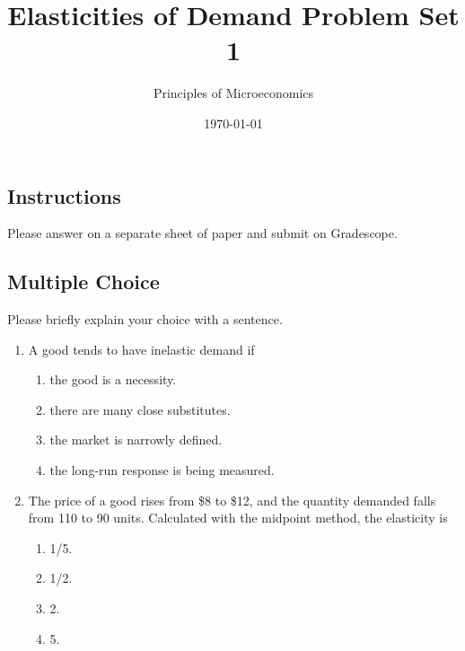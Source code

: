 \documentclass{article}
\title{Elasticities of Demand Problem Set 1}
\author{Principles of Microeconomics}
\date{\today}
\begin{document}
\maketitle

\subsection*{Instructions} Please answer on a separate sheet of paper and submit on Gradescope. 

\subsection*{Multiple Choice} Please briefly explain your choice with a sentence.

\begin{enumerate}

\item A good tends to have inelastic demand if

	\begin{enumerate}
	
	\item the good is a necessity.
	
	\item there are many close substitutes.
	
	\item the market is narrowly defined.
	
	\item the long-run response is being measured.
	
	\end{enumerate}
	
\item The price of a good rises from \$8 to \$12, and the quantity demanded falls from 110 to 90 units. Calculated with the midpoint method, the elasticity is

	\begin{enumerate}
	
	\item 1/5.
	
	\item 1/2.
	
	\item 2.
	
	\item 5.
	
	\end{enumerate}

\end{enumerate}
\end{document}
